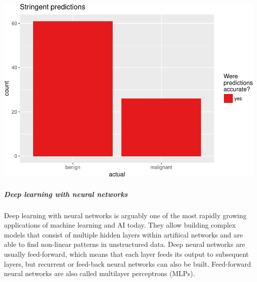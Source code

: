 \documentclass[]{article}
\newenvironment{Shaded}{\begin{snugshade}}{\end{snugshade}}
\newcommand{\KeywordTok}[1]{\textcolor[rgb]{0.13,0.29,0.53}{\textbf{{#1}}}}
\newcommand{\DataTypeTok}[1]{\textcolor[rgb]{0.13,0.29,0.53}{{#1}}}
\newcommand{\CharTok}[1]{\textcolor[rgb]{0.31,0.60,0.02}{{#1}}}
\newcommand{\StringTok}[1]{\textcolor[rgb]{0.31,0.60,0.02}{{#1}}}
\newcommand{\NormalTok}[1]{{#1}}
\let\oldsubparagraph\subparagraph
\renewcommand{\subparagraph}[1]{\oldsubparagraph{#1}\mbox{}}
\begin{document}
\begin{Shaded}
\end{Shaded}

\includegraphics{webinar_code_files/figure-latex/unnamed-chunk-52-2.pdf}

\subparagraph{Deep learning with neural
networks}\label{deep-learning-with-neural-networks}

Deep learning with neural networks is arguably one of the most rapidly
growing applications of machine learning and AI today. They allow
building complex models that consist of multiple hidden layers within
artifiical networks and are able to find non-linear patterns in
unstructured data. Deep neural networks are usually feed-forward, which
means that each layer feeds its output to subsequent layers, but
recurrent or feed-back neural networks can also be built. Feed-forward
neural networks are also called multilayer perceptrons (MLPs).
\end{document}
